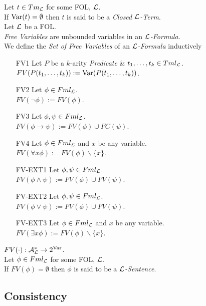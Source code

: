 \documentclass[11pt,a4paper]{article}
\begin{document}
Let $t\in Tm_{\mathcal{L}}$ for some FOL, $\mathcal{L}$.\\
If $\mathrm{Var}(t)=\emptyset$ then $t$ is said to be a \textit{Closed $\mathcal{L}$-Term}.\\

Let $\mathcal{L}$ be a FOL.\\
\textit{Free Variables} are unbounded variables in an \textit{$\mathcal{L}$-Formula}.\\
We define the \textit{Set of Free Variables} of an \textit{$\mathcal{L}$-Formula} inductively
\begin{itemize}
	\item[FV1] Let $P$ be a $k$-arity \textit{Predicate} \& $t_1,\dots,t_k\in Tml_{\mathcal{L}}$.\\
	$FV(P(t_1,\dots,t_k)):=\mathrm{Var}(P(t_1,\dots,t_k))$.
	\item[FV2] Let $\phi\in Fml_{\mathcal{L}}$.\\
	$FV(\neg\phi):=FV(\phi)$.
	\item[FV3] Let $\phi,\psi\in Fml_{\mathcal{L}}$.\\
	$FV(\phi\to\psi):=FV(\phi)\cup FC(\psi)$.
	\item[FV4] Let $\phi\in Fml_{\mathcal{L}}$ and $x$ be any variable.\\
	$FV(\forall x\phi):=FV(\phi)\backslash\{x\}$.
	\item[FV-EXT1]Let $\phi,\psi\in Fml_{\mathcal{L}}$.\\
	$FV(\phi\wedge\psi):=FV(\phi)\cup FV(\psi)$.
	\item[FV-EXT2]Let $\phi,\psi\in Fml_{\mathcal{L}}$.\\
	$FV(\phi\vee\psi):=FV(\phi)\cup FV(\psi)$.
	\item[FV-EXT3]Let $\phi\in Fml_{\mathcal{L}}$ and $x$ be any variable.\\
	$FV(\exists x\phi):=FV(\phi)\backslash\{x\}$.
\end{itemize}
\nb $FV(\cdot):\mathcal{A}^*_{\mathcal{L}}\to2^{\mathrm{Var}}$.\\

Let $\phi\in Fml_{\mathcal{L}}$ for some FOL, $\mathcal{L}$.\\
If $FV(\phi)=\emptyset$ then $\phi$ is said to be a \textit{$\mathcal{L}$-Sentence}.\\


\subsection{Consistency}
\end{document}
